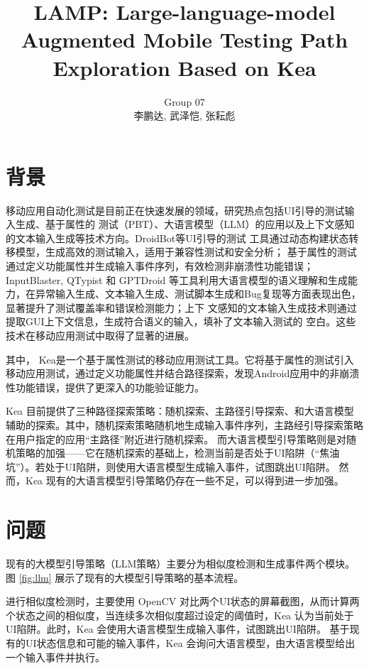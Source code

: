 \documentclass[twocolumn]{article}
\title{LAMP: Large-language-model Augmented Mobile Testing Path Exploration Based on Kea}
\author{Group 07 \\ 李鹏达, 武泽恺, 张耘彪}
\date{}
\begin{document}
\maketitle

\section{背景}

移动应用自动化测试是目前正在快速发展的领域，研究热点包括UI引导的测试输入生成、基于属性的
测试（PBT）、大语言模型（LLM）的应用以及上下文感知的文本输入生成等技术方向。DroidBot\cite{li2017droidbot}等UI引导的测试
工具通过动态构建状态转移模型，生成高效的测试输入，适用于兼容性测试和安全分析；
基于属性的测试\cite{xiong2024general}通过定义功能属性并生成输入事件序列，有效检测非崩溃性功能错误；
InputBlaster\cite{liu2024testing}, QTypist\cite{liu2023fill} 和 GPTDroid\cite{liu2024make} 等工具利用大语言模型的语义理解和生成能力，在异常输入生成、文本输入生成、测试脚本生成和Bug复现等方面表现出色，显著提升了测试覆盖率和错误检测能力；上下
文感知的文本输入生成技术\cite{liu2023fill}则通过提取GUI上下文信息，生成符合语义的输入，填补了文本输入测试的
空白。这些技术在移动应用测试中取得了显著的进展。

其中， Kea\cite{xiong2024general}是一个基于属性测试的移动应用测试工具。它将基于属性的测试引入移动应用测试，通过定义功能属性并结合路径探索，发现Android应用中的非崩溃性功能错误，提供了更深入的功能验证能力。


Kea 目前提供了三种路径探索策略：随机探索、主路径引导探索、和大语言模型辅助的探索。其中，随机探索策略随机地生成输入事件序列，主路经引导探索策略在用户指定的应用``主路径''附近进行随机探索。
而大语言模型引导策略则是对随机策略的加强——它在随机探索的基础上，检测当前是否处于UI陷阱（``焦油坑''\cite{khan2024aurora}）。若处于UI陷阱，则使用大语言模型生成输入事件，试图跳出UI陷阱。
然而，Kea 现有的大语言模型引导策略仍存在一些不足，可以得到进一步加强。

\section{问题}

现有的大模型引导策略（LLM策略）主要分为相似度检测和生成事件两个模块。图 \ref{fig:llm} 展示了现有的大模型引导策略的基本流程。

进行相似度检测时，主要使用 OpenCV 对比两个UI状态的屏幕截图，从而计算两个状态之间的相似度，当连续多次相似度超过设定的阈值时，Kea 认为当前处于UI陷阱。此时，Kea 会使用大语言模型生成输入事件，试图跳出UI陷阱。
基于现有的UI状态信息和可能的输入事件，Kea 会询问大语言模型，由大语言模型给出一个输入事件并执行。
\end{document}
